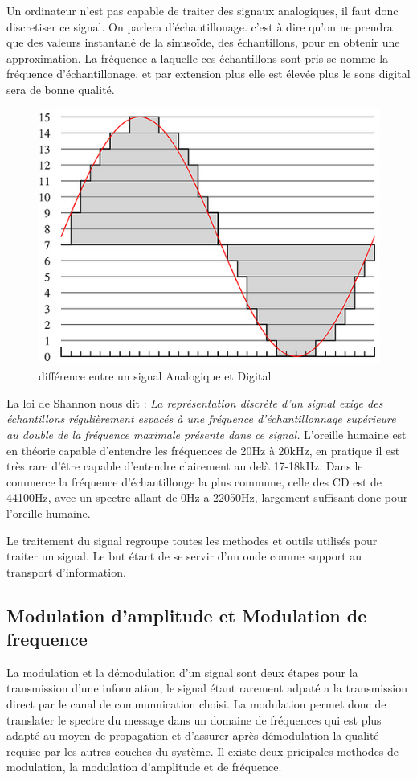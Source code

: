 \documentclass[12pt]{article}
\begin{document}
Un ordinateur n'est pas capable de traiter des signaux analogiques, il faut donc discretiser ce signal. On parlera d'échantillonage. c'est à dire qu'on ne prendra que des valeurs instantané de la sinusoïde, des échantillons, pour en obtenir une approximation. La fréquence a laquelle ces échantillons sont pris se nomme la fréquence d'échantillonage, et par extension plus elle est élevée plus le sons digital sera de bonne qualité. 
\begin{figure}[H]
\begin{center}
\caption{différence entre un signal Analogique et Digital}
\label{fig:analogDigit}
\includegraphics[scale=0.5]{analogique-digital.jpg}
\end{center}
\end{figure}
La loi de Shannon nous dit : \emph{\og La représentation discrète d'un signal exige des échantillons régulièrement espacés à une fréquence d'échantillonnage supérieure au double de la fréquence maximale présente dans ce signal. \fg{} }
L'oreille humaine est en théorie capable d'entendre les fréquences de 20Hz à 20kHz, en pratique il est très rare d'être capable d'entendre clairement au delà 17-18kHz.
Dans le commerce la fréquence d'échantillonge la plus commune, celle des CD est de 44100Hz, avec un spectre allant de 0Hz a 22050Hz, largement suffisant donc pour l'oreille humaine.

Le traitement du signal regroupe toutes les methodes et outils utilisés pour traiter un signal. Le but étant de se servir d'un onde comme support au transport d'information. 

\subsection{Modulation d'amplitude et Modulation de frequence}
La modulation et la démodulation d'un signal sont deux étapes pour la transmission d'une information, le signal étant rarement adpaté a la transmission direct par le canal de communnication choisi.
La modulation permet donc de translater le spectre du message dans un domaine de fréquences qui est plus adapté au moyen de propagation et d'assurer après démodulation la qualité requise par les autres couches du système. Il existe deux pricipales methodes de modulation, la modulation d'amplitude et de fréquence.
\end{document}
